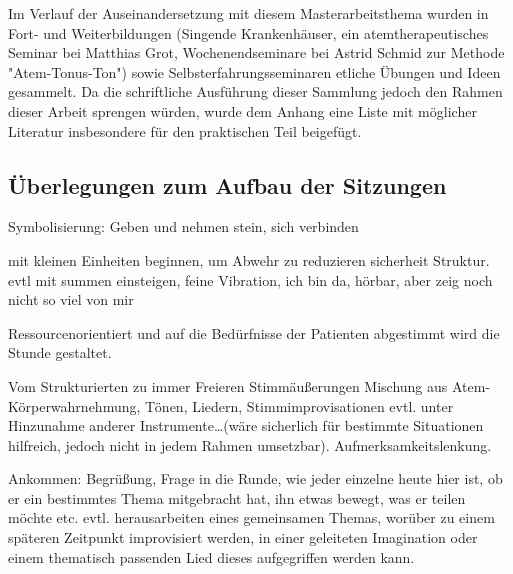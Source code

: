 Im Verlauf der Auseinandersetzung mit diesem Masterarbeitsthema wurden in Fort- und Weiterbildungen (Singende Krankenhäuser, ein atemtherapeutisches Seminar bei Matthias Grot, Wochenendseminare bei Astrid Schmid zur Methode "Atem-Tonus-Ton") sowie Selbsterfahrungsseminaren etliche Übungen und Ideen gesammelt. Da die schriftliche Ausführung dieser Sammlung jedoch den Rahmen dieser Arbeit sprengen würden, wurde dem Anhang eine Liste mit möglicher Literatur insbesondere für den praktischen Teil beigefügt.

\subsection{Überlegungen zum Aufbau der Sitzungen}
Symbolisierung: Geben und nehmen stein, sich verbinden

mit kleinen Einheiten beginnen, um Abwehr zu reduzieren sicherheit Struktur. evtl mit summen einsteigen, feine Vibration, ich bin da, hörbar, aber zeig noch nicht so viel von mir

Ressourcenorientiert und auf die Bedürfnisse der Patienten abgestimmt wird die Stunde gestaltet.

Vom Strukturierten zu immer Freieren Stimmäußerungen
Mischung aus Atem- Körperwahrnehmung, Tönen, Liedern, Stimmimprovisationen evtl. unter Hinzunahme anderer Instrumente…(wäre sicherlich für bestimmte Situationen hilfreich, jedoch nicht in jedem Rahmen umsetzbar). 
Aufmerksamkeitslenkung. 

Ankommen: 
Begrüßung, Frage in die Runde, wie jeder einzelne heute hier ist, ob er ein bestimmtes Thema mitgebracht hat, ihn etwas bewegt, was er teilen möchte etc. evtl. herausarbeiten eines gemeinsamen Themas, worüber zu einem späteren Zeitpunkt improvisiert werden, in einer geleiteten Imagination oder einem thematisch passenden Lied dieses aufgegriffen werden kann.

